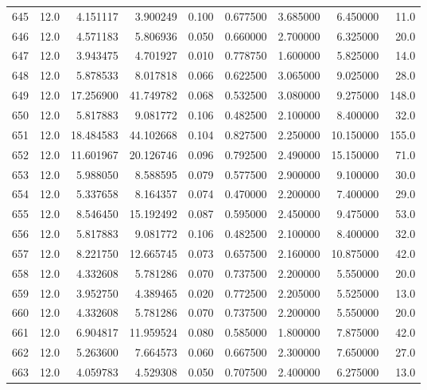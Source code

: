 \begin{tabular}{lrrrrrrrr}
645  &   12.0 &   4.151117 &   3.900249 &  0.100 &  0.677500 &  3.685000 &   6.450000 &   11.0 \\
646  &   12.0 &   4.571183 &   5.806936 &  0.050 &  0.660000 &  2.700000 &   6.325000 &   20.0 \\
647  &   12.0 &   3.943475 &   4.701927 &  0.010 &  0.778750 &  1.600000 &   5.825000 &   14.0 \\
648  &   12.0 &   5.878533 &   8.017818 &  0.066 &  0.622500 &  3.065000 &   9.025000 &   28.0 \\
649  &   12.0 &  17.256900 &  41.749782 &  0.068 &  0.532500 &  3.080000 &   9.275000 &  148.0 \\
650  &   12.0 &   5.817883 &   9.081772 &  0.106 &  0.482500 &  2.100000 &   8.400000 &   32.0 \\
651  &   12.0 &  18.484583 &  44.102668 &  0.104 &  0.827500 &  2.250000 &  10.150000 &  155.0 \\
652  &   12.0 &  11.601967 &  20.126746 &  0.096 &  0.792500 &  2.490000 &  15.150000 &   71.0 \\
653  &   12.0 &   5.988050 &   8.588595 &  0.079 &  0.577500 &  2.900000 &   9.100000 &   30.0 \\
654  &   12.0 &   5.337658 &   8.164357 &  0.074 &  0.470000 &  2.200000 &   7.400000 &   29.0 \\
655  &   12.0 &   8.546450 &  15.192492 &  0.087 &  0.595000 &  2.450000 &   9.475000 &   53.0 \\
656  &   12.0 &   5.817883 &   9.081772 &  0.106 &  0.482500 &  2.100000 &   8.400000 &   32.0 \\
657  &   12.0 &   8.221750 &  12.665745 &  0.073 &  0.657500 &  2.160000 &  10.875000 &   42.0 \\
658  &   12.0 &   4.332608 &   5.781286 &  0.070 &  0.737500 &  2.200000 &   5.550000 &   20.0 \\
659  &   12.0 &   3.952750 &   4.389465 &  0.020 &  0.772500 &  2.205000 &   5.525000 &   13.0 \\
660  &   12.0 &   4.332608 &   5.781286 &  0.070 &  0.737500 &  2.200000 &   5.550000 &   20.0 \\
661  &   12.0 &   6.904817 &  11.959524 &  0.080 &  0.585000 &  1.800000 &   7.875000 &   42.0 \\
662  &   12.0 &   5.263600 &   7.664573 &  0.060 &  0.667500 &  2.300000 &   7.650000 &   27.0 \\
663  &   12.0 &   4.059783 &   4.529308 &  0.050 &  0.707500 &  2.400000 &   6.275000 &   13.0 \\

\end{tabular}
